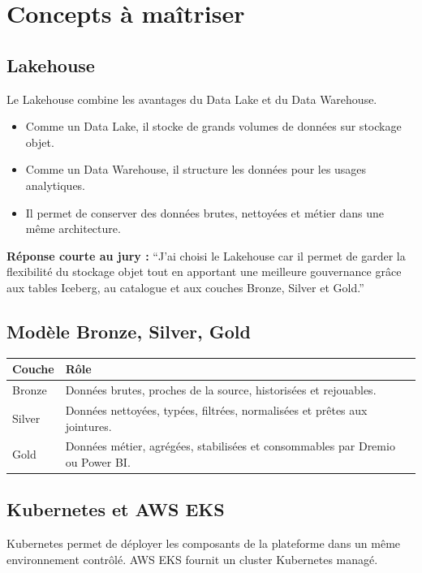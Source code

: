 \documentclass[11pt,a4paper]{article}
\newcommand{\important}[1]{%
  \vspace{0.25cm}
  \noindent
  \colorbox{softblue}{%
    \parbox{\dimexpr\textwidth-2\fboxsep\relax}{#1}%
  }
  \vspace{0.2cm}
}
\begin{document}
\section{Concepts à maîtriser}

\subsection{Lakehouse}

Le Lakehouse combine les avantages du Data Lake et du Data Warehouse.
\begin{itemize}
  \item Comme un Data Lake, il stocke de grands volumes de données sur stockage objet.
  \item Comme un Data Warehouse, il structure les données pour les usages analytiques.
  \item Il permet de conserver des données brutes, nettoyées et métier dans une même architecture.
\end{itemize}

\important{
\textbf{Réponse courte au jury :}
``J'ai choisi le Lakehouse car il permet de garder la flexibilité du stockage objet tout en apportant une meilleure gouvernance grâce aux tables Iceberg, au catalogue et aux couches Bronze, Silver et Gold.''
}

\subsection{Modèle Bronze, Silver, Gold}

\begin{tabularx}{\textwidth}{@{}p{}X@{}}
\toprule
\textbf{Couche} & \textbf{Rôle} \\
\midrule
Bronze & Données brutes, proches de la source, historisées et rejouables. \\
Silver & Données nettoyées, typées, filtrées, normalisées et prêtes aux jointures. \\
Gold & Données métier, agrégées, stabilisées et consommables par Dremio ou Power BI. \\
\bottomrule
\end{tabularx}

\subsection{Kubernetes et AWS EKS}

Kubernetes permet de déployer les composants de la plateforme dans un même environnement contrôlé. AWS EKS fournit un cluster Kubernetes managé.
\end{document}
